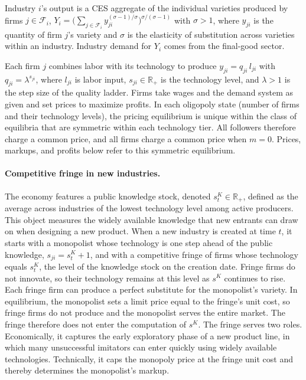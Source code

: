 \documentclass[12pt]{article}
\begin{document}
Industry \(i\)'s output is a CES aggregate of the individual varieties produced by firms \(j\in\mathcal{F}_i\), \(Y_i=\big(\sum_{j\in\mathcal{F}_i} y_{ji}^{(\sigma-1)/\sigma}\big)^{\sigma/(\sigma-1)}\) with \(\sigma>1\), where \(y_{ji}\) is the quantity of firm \(j\)'s variety and \(\sigma\) is the elasticity of substitution across varieties within an industry. Industry demand for \(Y_i\) comes from the final-good sector.

Each firm \(j\) combines labor with its technology to produce \(y_{ji}=q_{ji}\,l_{ji}\) with \(q_{ji}=\lambda^{s_{ji}}\), where \(l_{ji}\) is labor input, \(s_{ji}\in\mathbb{R}_+\) is the technology level, and \(\lambda>1\) is the step size of the quality ladder. Firms take wages and the demand system as given and set prices to maximize profits. In each oligopoly state (number of firms and their technology levels), the pricing equilibrium is unique within the class of equilibria that are symmetric within each technology tier. All followers therefore charge a common price, and all firms charge a common price when \(m=0\). Prices, markups, and profits below refer to this symmetric equilibrium.

\paragraph{Competitive fringe in new industries.}

The economy features a public knowledge stock, denoted \(s^K_t\in\mathbb{R}_+\), defined as the average across industries of the lowest technology level among active producers. This object measures the widely available knowledge that new entrants can draw on when designing a new product. When a new industry is created at time \(t\), it starts with a monopolist whose technology is one step ahead of the public knowledge, \(s_{ji} = s^K_t+1\), and with a competitive fringe of firms whose technology equals \(s^K_t\), the level of the knowledge stock on the creation date. Fringe firms do not innovate, so their technology remains at this level as \(s^K\) continues to rise. Each fringe firm can produce a perfect substitute for the monopolist's variety. In equilibrium, the monopolist sets a limit price equal to the fringe's unit cost, so fringe firms do not produce and the monopolist serves the entire market. The fringe therefore does not enter the computation of \(s^K\). The fringe serves two roles. Economically, it captures the early exploratory phase of a new product line, in which many unsuccessful imitators can enter quickly using widely available technologies. Technically, it caps the monopoly price at the fringe unit cost and thereby determines the monopolist's markup.
\end{document}
